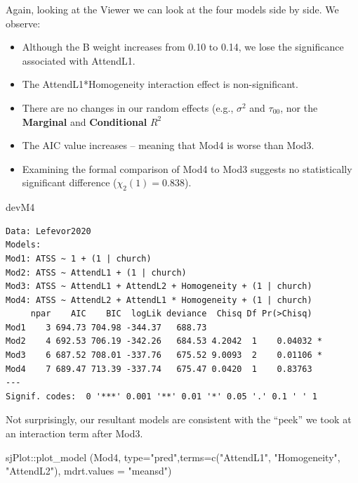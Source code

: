 \documentclass[
  english,
]{book}
\newenvironment{Shaded}{\begin{snugshade}}{\end{snugshade}}
\newcommand{\AttributeTok}[1]{\textcolor[rgb]{0.77,0.63,0.00}{#1}}
\newcommand{\FunctionTok}[1]{\textcolor[rgb]{0.00,0.00,0.00}{#1}}
\newcommand{\NormalTok}[1]{#1}
\newcommand{\SpecialCharTok}[1]{\textcolor[rgb]{0.00,0.00,0.00}{#1}}
\newcommand{\StringTok}[1]{\textcolor[rgb]{0.31,0.60,0.02}{#1}}
\providecommand{\tightlist}{%
  \setlength{\itemsep}{0pt}\setlength{\parskip}{0pt}}
\begin{document}
Again, looking at the Viewer we can look at the four models side by side. We observe:

\begin{itemize}
\tightlist
\item
  Although the B weight increases from 0.10 to 0.14, we lose the significance associated with AttendL1.
\item
  The AttendL1*Homogeneity interaction effect is non-significant.
\item
  There are no changes in our random effects (e.g., \(\sigma^{2}\) and \(\tau _{00}\), nor the \textbf{Marginal} and \textbf{Conditional} \(R^2\)
\item
  The AIC value increases -- meaning that Mod4 is worse than Mod3.
\item
  Examining the formal comparison of Mod4 to Mod3 suggests no statistically significant difference (\(\chi_{2}(1) = 0.838\)).
\end{itemize}

\begin{Shaded}
\begin{Highlighting}[]
\NormalTok{devM4}
\end{Highlighting}
\end{Shaded}

\begin{verbatim}
Data: Lefevor2020
Models:
Mod1: ATSS ~ 1 + (1 | church)
Mod2: ATSS ~ AttendL1 + (1 | church)
Mod3: ATSS ~ AttendL1 + AttendL2 + Homogeneity + (1 | church)
Mod4: ATSS ~ AttendL2 + AttendL1 * Homogeneity + (1 | church)
     npar    AIC    BIC  logLik deviance  Chisq Df Pr(>Chisq)  
Mod1    3 694.73 704.98 -344.37   688.73                       
Mod2    4 692.53 706.19 -342.26   684.53 4.2042  1    0.04032 *
Mod3    6 687.52 708.01 -337.76   675.52 9.0093  2    0.01106 *
Mod4    7 689.47 713.39 -337.74   675.47 0.0420  1    0.83763  
---
Signif. codes:  0 '***' 0.001 '**' 0.01 '*' 0.05 '.' 0.1 ' ' 1
\end{verbatim}

Not surprisingly, our resultant models are consistent with the ``peek'' we took at an interaction term after Mod3.

\begin{Shaded}
\begin{Highlighting}[]
\NormalTok{sjPlot}\SpecialCharTok{::}\FunctionTok{plot\_model}\NormalTok{ (Mod4, }\AttributeTok{type=}\StringTok{"pred"}\NormalTok{,}\AttributeTok{terms=}\FunctionTok{c}\NormalTok{(}\StringTok{"AttendL1"}\NormalTok{, }\StringTok{"Homogeneity"}\NormalTok{, }\StringTok{"AttendL2"}\NormalTok{), }\AttributeTok{mdrt.values =} \StringTok{"meansd"}\NormalTok{)}
\end{Highlighting}
\end{Shaded}
\end{document}
